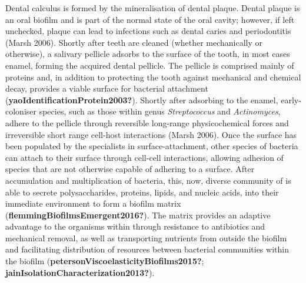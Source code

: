 \documentclass[
]{article}
\begin{document}
Dental calculus is formed by the mineralisation of dental plaque. Dental
plaque is an oral biofilm and is part of the normal state of the oral
cavity; however, if left unchecked, plaque can lead to infections such
as dental caries and periodontitis (Marsh 2006). Shortly after teeth are
cleaned (whether mechanically or otherwise), a salivary pellicle adsorbs
to the surface of the tooth, in most cases enamel, forming the acquired
dental pellicle. The pellicle is comprised mainly of proteins and, in
addition to protecting the tooth against mechanical and chemical decay,
provides a viable surface for bacterial attachment
(\textbf{yaoIdentificationProtein2003?}). Shortly after adsorbing to the
enamel, early-coloniser species, such as those within genus
\emph{Streptococcus} and \emph{Actinomyces}, adhere to the pellicle
through reversible long-range physicochemical forces and irreversible
short range cell-host interactions (Marsh 2006). Once the surface has
been populated by the specialists in surface-attachment, other species
of bacteria can attach to their surface through cell-cell interactions,
allowing adhesion of species that are not otherwise capable of adhering
to a surface. After accumulation and multiplication of bacteria, this,
now, diverse community of is able to secrete polysaccharides, proteins,
lipids, and nucleic acids, into their immediate environment to form a
biofilm matrix (\textbf{flemmingBiofilmsEmergent2016?}). The matrix
provides an adaptive advantage to the organisms within through
resistance to antibiotics and mechanical removal, as well as
transporting nutrients from outside the biofilm and facilitating
distribution of resources between bacterial communities within the
biofilm (\textbf{petersonViscoelasticityBiofilms2015?};
\textbf{jainIsolationCharacterization2013?}).
\end{document}
